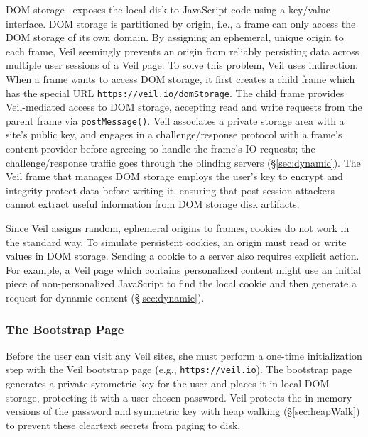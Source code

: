 DOM storage~\cite{domStorage} exposes the
local disk to JavaScript code using a key/value
interface. DOM storage is partitioned by origin,
i.e., a frame can only access the DOM storage of
its own domain. By assigning an ephemeral, unique
origin to each frame, Veil seemingly prevents
an origin from reliably persisting data across
multiple user sessions of a Veil page. To solve
this problem, Veil uses indirection. When a
frame wants to access DOM storage, it first
creates a child frame which has the special URL
\texttt{https://veil.io/domStorage}. The child
frame provides Veil-mediated access to DOM storage,
accepting read and write requests from the parent
frame via \texttt{postMessage()}. Veil associates
a private storage area with a site's public key,
and engages in a challenge/response protocol
with a frame's content provider before agreeing
to handle the frame's IO requests; the challenge/response
traffic goes through the blinding servers (\S\ref{sec:dynamic}).
The Veil frame that manages DOM storage employs
the user's key to encrypt and
integrity-protect data before writing it,
ensuring that post-session attackers cannot
extract useful information from DOM storage
disk artifacts.

Since Veil assigns random, ephemeral origins
to frames, cookies do not work in the standard
way. To simulate persistent cookies, an origin
must read or write values in DOM storage. Sending
a cookie to a server also requires explicit
action. For example, a Veil page which contains
personalized content might use an initial piece
of non-personalized JavaScript to find the local
cookie and then generate a request for dynamic
content (\S\ref{sec:dynamic}).

\subsubsection{The Bootstrap Page}
\label{sec:bootstrap}
Before the user can visit any Veil sites, she
must perform a one-time initialization step
with the Veil bootstrap page (e.g., \texttt{https://veil.io}).
The bootstrap page generates a private symmetric key for
the user and places it in local DOM storage,
protecting it with a user-chosen password. Veil
protects the in-memory versions of the password and
symmetric key with heap walking (\S\ref{sec:heapWalk})
to prevent these cleartext secrets from paging to disk.

